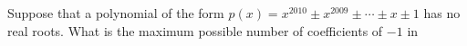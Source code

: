 Suppose that a polynomial of the form $p(x)=x^{2010}\pm x^{2009}\pm \cdots \pm x \pm 1$ has no real roots.  What is the maximum possible number of coefficients of $-1$ in 